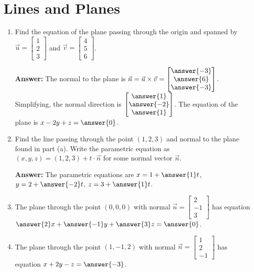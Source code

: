 \documentclass{ximera}
\begin{document}
\section*{Lines and Planes}

\begin{example}
    \begin{enumerate}
        \item Find the equation of the plane passing through the origin and spanned by $\vec{u} = \begin{bmatrix} 1 \\ 2 \\ 3 \end{bmatrix}$ and $\vec{v} = \begin{bmatrix} 4 \\ 5 \\ 6 \end{bmatrix}$.

        \textbf{Answer:} The normal to the plane is $\vec{n} = \vec{u}\times\vec{v} = \begin{bmatrix} \answer{-3} \\ \answer{6} \\ \answer{-3} \end{bmatrix}$. Simplifying, the normal direction is $\begin{bmatrix} \answer{1} \\ \answer{-2} \\ \answer{1} \end{bmatrix}$. The equation of the plane is $x - 2y + z = \answer{0}$.

        \item Find the line passing through the point $(1,2,3)$ and normal to the plane found in part (a). Write the parametric equation as $(x,y,z) = (1,2,3) + t\cdot\vec{n}$ for some normal vector $\vec{n}$.

        \textbf{Answer:} The parametric equations are $x = 1 + \answer{1}t$, $y = 2 + \answer{-2}t$, $z = 3 + \answer{1}t$.

        \item The plane through the point $(0,0,0)$ with normal $\vec{n} = \begin{bmatrix} 2 \\ -1 \\ 3 \end{bmatrix}$ has equation $\answer{2}x + \answer{-1}y + \answer{3}z = \answer{0}$.

        \item The plane through the point $(1,-1,2)$ with normal $\vec{n} = \begin{bmatrix} 1 \\ 2 \\ -1 \end{bmatrix}$ has equation $x + 2y - z = \answer{-3}$.
    \end{enumerate}
\end{example}
\end{document}
